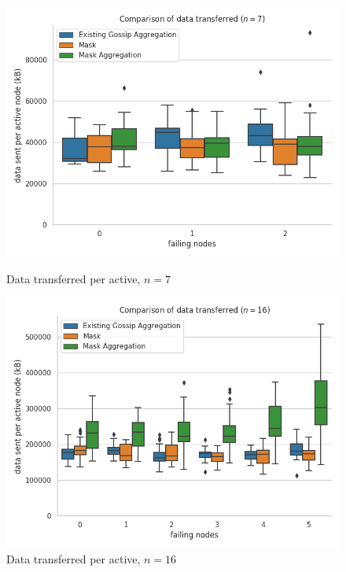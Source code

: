 \begin{figure}[H]
    \centering
    \begin{minipage}{0.5\textwidth}
        \centering
        \includegraphics[width=\textwidth]{images/aggregation_bandwidth_tx_sum_7.png}
        \captionsetup{labelformat=empty}
        \caption{Data transferred per active, $n = 7$}
    \end{minipage}\hfill
    \begin{minipage}{0.5\textwidth}
        \centering
        \includegraphics[width=\textwidth]{images/aggregation_bandwidth_tx_sum_16.png}
        \captionsetup{labelformat=empty}
        \caption{Data transferred per active, $n = 16$}
    \end{minipage}\hfill
\end{figure}

